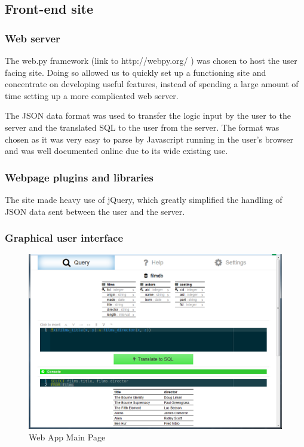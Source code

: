 \documentclass[a4paper, 11pt]{article}
\begin{document}
  \subsection{Front-end site}
    \subsubsection{Web server}
      The web.py framework (link to http://webpy.org/ ) was chosen to host the
      user facing site. Doing so allowed us to quickly set up a functioning site
      and concentrate on developing useful features, instead of spending a large
      amount of time setting up a more complicated web server.

      The JSON data format was used to transfer the logic input by the user to the
      server and the translated SQL to the user from the server. The format was
      chosen as it was very easy to parse by Javascript running in the user's
      browser and was well documented online due to its wide existing use.

    \subsubsection{Webpage plugins and libraries}
      The site made heavy use of jQuery, which greatly simplified the handling
      of JSON data sent between the user and the server.  

    \subsubsection{Graphical user interface}
      \begin{figure}[h]
        \includegraphics[width=\textwidth]{Images/Site.png}
        \caption{Web App Main Page}
      \end{figure}
\end{document}
